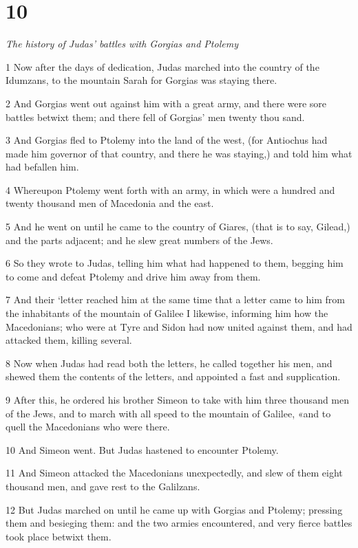 \chapter{10}

\par \textit{The history of Judas’ battles with Gorgias and Ptolemy}

1 Now after the days of dedication, Judas marched into the country of the Idumzans, to the mountain Sarah for Gorgias was staying there. 

2 And Gorgias went out against him with a great army, and there were sore battles betwixt them; and there fell of Gorgias’ men twenty thou sand. 

3 And Gorgias fled to Ptolemy into the land of the west, (for Antiochus had made him governor of that country, and there he was staying,) and told him what had befallen him. 

4 Whereupon Ptolemy went forth with an army, in which were a hundred and twenty thousand men of Macedonia and the east. 

5 And he went on until he came to the country of Giares, (that is to say, Gilead,) and the parts adjacent; and he slew great numbers of the Jews. 

6 So they wrote to Judas, telling him what had happened to them, begging him to come and defeat Ptolemy and drive him away from them. 

7 And their ‘letter reached him at the same time that a letter came to him from the inhabitants of the mountain of Galilee I likewise, informing him how the Macedonians; who were at Tyre and Sidon had now united against them, and had attacked them, killing several. 

8 Now when Judas had read both the letters, he called together his men, and shewed them the contents of the letters, and appointed a fast and supplication. 

9 After this, he ordered his brother Simeon to take with him three thousand men of the Jews, and to march with all speed to the mountain of Galilee, «and to quell the Macedonians who were there. 

10 And Simeon went. But Judas hastened to encounter Ptolemy. 

11 And Simeon attacked the Macedonians unexpectedly, and slew of them eight thousand men, and gave rest to the Galilzans. 

12 But Judas marched on until he came up with Gorgias and Ptolemy; pressing them and besieging them: and the two armies encountered, and very fierce battles took place betwixt them. 

